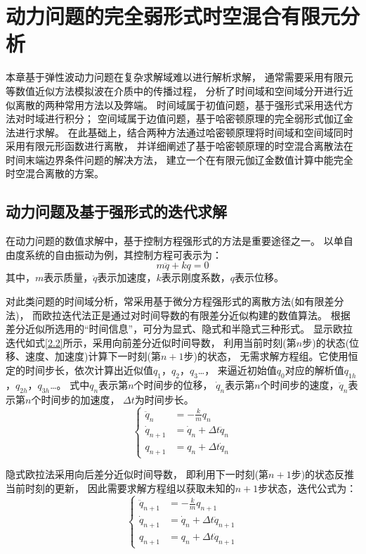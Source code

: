\chapter{动力问题的完全弱形式时空混合有限元分析}

本章基于弹性波动力问题在复杂求解域难以进行解析求解，
通常需要采用有限元等数值近似方法模拟波在介质中的传播过程，
分析了时间域和空间域分开进行近似离散的两种常用方法以及弊端。
时间域属于初值问题，基于强形式采用迭代方法对时域进行积分；
空间域属于边值问题，基于哈密顿原理的完全弱形式伽辽金法进行求解。
在此基础上，结合两种方法通过哈密顿原理将时间域和空间域同时采用有限元形函数进行离散，
并详细阐述了基于哈密顿原理的时空混合离散法在时间末端边界条件问题的解决方法，
建立一个在有限元伽辽金数值计算中能完全时空混合离散的方案。

\section{动力问题及基于强形式的迭代求解}

在动力问题的数值求解中，基于控制方程强形式的方法是重要途径之一。
以单自由度系统的自由振动为例，其控制方程可表示为：
\begin{equation}\label{2.1}
m \ddot q + k q =0
\end{equation}
其中，$m$表示质量，$\ddot q$表示加速度，$k$表示刚度系数，$q$表示位移。

对此类问题的时间域分析，常采用基于微分方程强形式的离散方法(如有限差分法)，
而欧拉迭代法正是通过对时间导数的有限差分近似构建的数值算法。
根据差分近似所选用的“时间信息”，可分为显式、隐式和半隐式三种形式。
显示欧拉迭代如式\ref{2.2}所示，采用向前差分近似时间导数，
利用当前时刻(第$n$步)的状态(位移、速度、加速度)计算下一时刻(第$n+1$步)的状态，
无需求解方程组。它使用恒定的时间步长，依次计算出近似值$q_1$，$q_2$，$q_3$\dots，
来逼近初始值$q_0$对应的解析值$q_{1h}$，$q_{2h}$，$q_{3h}$\dots。
式中$q_n$表示第$n$个时间步的位移，
$\dot q_n$表示第$n$个时间步的速度，$\ddot q_n$表示第$n$个时间步的加速度，
$\Delta t$为时间步长。
\begin{equation}\label{2.2}
\left \{
\begin{split}
\ddot q_n &= - \frac{k}{m} q_n \\
\dot q_{n+1} &= \dot q_n + \Delta t \ddot q_n \\
q_{n+1} &= q_n + \Delta t \dot q_n
\end{split}
\right .
\end{equation}

隐式欧拉法采用向后差分近似时间导数，
即利用下一时刻(第$n+1$步)的状态反推当前时刻的更新，
因此需要求解方程组以获取未知的$n+1$步状态，迭代公式为：
\begin{equation}\label{2.3}
\left \{
\begin{split}
\ddot q_{n+1} &= - \frac{k}{m} q_{n+1} \\
\dot q_{n+1} &= \dot q_n + \Delta t \ddot q_{n+1} \\
q_{n+1} &= q_n + \Delta t \dot q_{n+1}
\end{split}
\right .
\end{equation}

